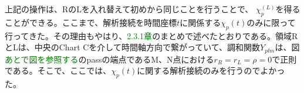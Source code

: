 上記の操作は、RのLを入れ替えて初めから同じことを行うことで、 $\chi_p^{(L)}$を得ることができる。ここまで、解析接続を時間座標$t$に関係する$\chi_p(t)$のみに限って行ってきた。その理由もやはり、\textcolor{green}{2.3.1章}のまとめで述べたとおりである。領域RとLは、中央のChart Cを介して時間軸方向で繋がっていて、調和関数$Y_{plm}$は、図\textcolor{green}{あとで図を参照する}のpassの端点であるM、N点における$r_R=r_L=\rho=0$で正則である。そこで、ここでは、$\chi_p(t)$に関する解析接続のみを行うのでよかった。

%
